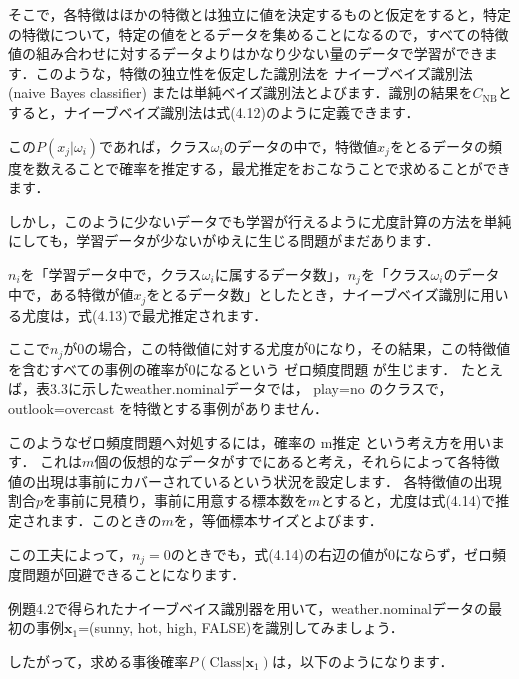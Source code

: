 そこで，各特徴はほかの特徴とは独立に値を決定するものと仮定をすると，特定の特徴について，特定の値をとるデータを集めることになるので，すべての特徴値の組み合わせに対するデータよりはかなり少ない量のデータで学習ができます．このような，特徴の独立性を仮定した識別法を
ナイーブベイズ識別法 (naive Bayes classifier)
または単純ベイズ識別法とよびます．識別の結果を$C_{\mbox{NB}}$とすると，ナイーブベイズ識別法は式(4.12)のように定義できます．


この$P(x_{j} \vert \omega_i)$であれば，クラス$\omega_i$のデータの中で，特徴値$x_{j}$をとるデータの頻度を数えることで確率を推定する，最尤推定をおこなうことで求めることができます．


しかし，このように少ないデータでも学習が行えるように尤度計算の方法を単純にしても，学習データが少ないがゆえに生じる問題がまだあります．

$n_i$を「学習データ中で，クラス$\omega_i$に属するデータ数」，$n_{j}$を「クラス$\omega_i$のデータ中で，ある特徴が値$x_j$をとるデータ数」としたとき，ナイーブベイズ識別に用いる尤度は，式(4.13)で最尤推定されます．


ここで$n_{j}$が0の場合，この特徴値に対する尤度が$0$になり，その結果，この特徴値を含むすべての事例の確率が$0$になるという
ゼロ頻度問題
が生じます．
たとえば，表3.3に示したweather.nominalデータでは， play=no のクラスで，outlook=overcast を特徴とする事例がありません．

このようなゼロ頻度問題へ対処するには，確率の
m推定
という考え方を用います．
これは$m$個の仮想的なデータがすでにあると考え，それらによって各特徴値の出現は事前にカバーされているという状況を設定します．
各特徴値の出現割合$p$を事前に見積り，事前に用意する標本数を$m$とすると，尤度は式(4.14)で推定されます．このときの$m$を，等価標本サイズとよびます．


この工夫によって，$n_j = 0$のときでも，式(4.14)の右辺の値が0にならず，ゼロ頻度問題が回避できることになります．


例題4.2で得られたナイーブベイス識別器を用いて，weather.nominalデータの最初の事例$\bm{x}_1$=(sunny, hot, high, FALSE)を識別してみましょう．



したがって，求める事後確率$P(\mbox{Class}|\bm{x}_1)$は，以下のようになります．

